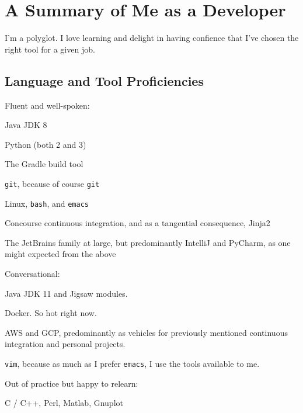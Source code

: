 \documentclass[10pt,letterpaper]{article}
\newcommand\ttt\texttt
\renewenvironment{itemize}{
  \begin{list}{}{
    \setlength{\leftmargin}{1.5em}
    \setlength{\itemsep}{0.25em}
    \setlength{\parskip}{0pt}
    \setlength{\parsep}{0.25em}
  }
}{
  \end{list}
}
\begin{document}

\newpage

\section*{A Summary of Me as a Developer}

I'm a polyglot.  I love learning and delight in having confience that I've chosen the right tool for a given job.

\subsection*{Language and Tool Proficiencies}
\begin{itemize}
  \item Fluent and well-spoken:
  \begin{itemize}
    \item Java JDK 8
    \item Python (both 2 and 3)
    \item The Gradle build tool
    \item \ttt{git}, because of course \ttt{git}
    \item Linux, \ttt{bash}, and \ttt{emacs}
    \item Concourse continuous integration, and as a tangential consequence, Jinja2
    \item The JetBrains family at large, but predominantly IntelliJ and PyCharm, as one might expected from the above
  \end{itemize}
  \item Conversational:
  \begin{itemize}
    \item Java JDK 11 and Jigsaw modules.
    \item Docker.  So hot right now.
    \item AWS and GCP, predominantly as vehicles for previously mentioned continuous integration and personal projects.
    \item \ttt{vim}, because as much as I prefer \ttt{emacs}, I use the tools available to me.
  \end{itemize}
  \item Out of practice but happy to relearn:
  \begin{itemize}
    \item C / C++, Perl, Matlab, Gnuplot
  \end{itemize}
\end{itemize}
\end{document}
